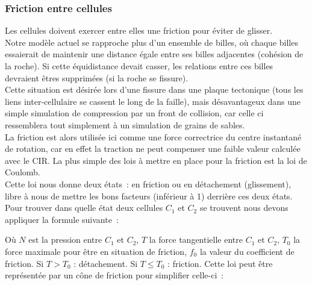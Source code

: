 \documentclass[a4paper,11pt]{article}
\begin{document}
\subsubsection{Friction entre cellules}
Les cellules doivent exercer entre elles une friction pour éviter de glisser.\\
Notre modèle actuel se rapproche plus d'un ensemble de billes, où chaque billes essaierait de maintenir une distance égale entre ses billes adjacentes (cohésion de la roche).
Si cette équidistance devait casser, les relations entre ces billes devraient êtres supprimées (si la roche se fissure).\\
Cette situation est désirée lors d'une fissure dans une plaque tectonique (tous les liens inter-cellulaire se cassent le long de la faille), mais désavantageux dans une simple simulation de compression par un front de collision, car celle ci ressemblera tout simplement à un simulation de grains de sables.\\
La friction est alors utilisée ici comme une force correctrice du centre instantané de rotation, car en effet la traction ne peut compenser une faible valeur calculée avec le CIR.
La plus simple des lois à mettre en place pour la friction est la loi de Coulomb. \\
Cette loi nous donne deux états~: en friction ou en détachement (glissement), libre à nous de mettre les bons facteurs (inférieur à 1) derrière ces deux états.
Pour trouver dans quelle état deux cellules $C_1$ et $C_2$ se trouvent nous devons appliquer la formule suivante~:
\begin{center}
\end{center}
\bigbreak
Où $N$ est la pression entre $C_1$ et $C_2$, $T$ la force tangentielle entre $C_1$ et $C_2$, $T_0$ la force maximale pour être en situation de friction, $f_0$ la valeur du coefficient de friction.
\medbreak
Si $T > T_0$ : détachement.
Si $T \leqslant T_0$ : friction.
\medbreak
Cette loi peut être représentée par un cône de friction pour simplifier celle-ci~: \\

\begin{center}
\end{center}
\end{document}

